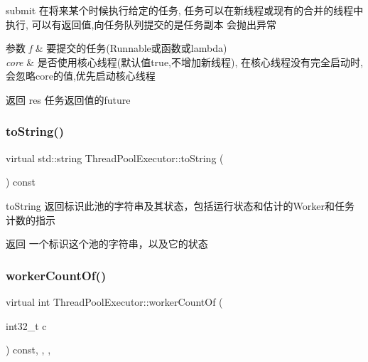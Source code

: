 submit 在将来某个时候执行给定的任务, 任务可以在新线程或现有的合并的线程中执行, 可以有返回值,向任务队列提交的是任务副本 会抛出异常 


\begin{DoxyParams}{参数}
{\em f} & 要提交的任务(Runnable或函数或lambda) \\
\hline
{\em core} & 是否使用核心线程(默认值true,不增加新线程), 在核心线程没有完全启动时,会忽略core的值,优先启动核心线程\\
\hline
\end{DoxyParams}
\begin{DoxyReturn}{返回}
res 任务返回值的future 
\end{DoxyReturn}
\mbox{\label{classThreadPoolExecutor_a8e340cec3bb976f7773db103d73189c2}} 
\subsubsection{\texorpdfstring{to\+String()}{toString()}}
{\footnotesize\ttfamily virtual std\+::string Thread\+Pool\+Executor\+::to\+String (\begin{DoxyParamCaption}{ }\end{DoxyParamCaption}) const\hspace{0.3cm}{\ttfamily [virtual]}}



to\+String 返回标识此池的字符串及其状态，包括运行状态和估计的\+Worker和任务计数的指示 

\begin{DoxyReturn}{返回}
一个标识这个池的字符串，以及它的状态 
\end{DoxyReturn}
\mbox{\label{classThreadPoolExecutor_a4f842d070a584bbc16a693207a947aac}} 
\subsubsection{\texorpdfstring{worker\+Count\+Of()}{workerCountOf()}}
{\footnotesize\ttfamily virtual int Thread\+Pool\+Executor\+::worker\+Count\+Of (\begin{DoxyParamCaption}\item[{int32\+\_\+t}]{c }\end{DoxyParamCaption}) const\hspace{0.3cm}{\ttfamily [inline]}, {\ttfamily [final]}, {\ttfamily [protected]}, {\ttfamily [virtual]}}



